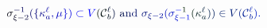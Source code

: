 \documentclass[12pt]{article}
\begin{document}
\makeatletter
\renewcommand*{\@textcolor}[3]{%
  \protect\leavevmode
  \begingroup
    \color#1{#2}#3%
  \endgroup
}
\makeatother
\begin{displaymath}
\mathcolor[RGB]{0,0,15}{\sigma} _ { \mathcolor[RGB]{0,0,30}{\xi} \mathcolor[RGB]{0,0,45}{-} \mathcolor[RGB]{0,0,60}{2} } ^ { \mathcolor[RGB]{0,0,75}{-} \mathcolor[RGB]{0,0,90}{1} } \mathcolor[RGB]{0,0,105}{(} \mathcolor[RGB]{0,0,120}{\{} \mathcolor[RGB]{0,0,135}{\kappa} _ { \mathcolor[RGB]{0,0,150}{a} } ^ { \mathcolor[RGB]{0,0,165}{\ell} } \mathcolor[RGB]{0,0,180}{,} \mathcolor[RGB]{0,0,195}{\mu} \mathcolor[RGB]{0,0,210}{\}} \mathcolor[RGB]{0,0,225}{)} \mathcolor[RGB]{0,0,240}{\subset} \mathcolor[RGB]{0,0,255}{V} \mathcolor[RGB]{0,15,0}{(} \mathcal { \mathcolor[RGB]{0,15,15}{C} } _ { \mathcolor[RGB]{0,15,30}{b} } ^ { \mathcolor[RGB]{0,15,45}{\ell} } \mathcolor[RGB]{0,15,60}{)} \mathrm { ~ \mathcolor[RGB]{0,15,75}{a} \mathcolor[RGB]{0,15,90}{n} \mathcolor[RGB]{0,15,105}{d} ~ } \mathcolor[RGB]{0,15,120}{\sigma} _ { \mathcolor[RGB]{0,15,135}{\xi} \mathcolor[RGB]{0,15,150}{-} \mathcolor[RGB]{0,15,165}{2} } \mathcolor[RGB]{0,15,180}{(} \mathcolor[RGB]{0,15,195}{\sigma} _ { \mathcolor[RGB]{0,15,210}{\xi} \mathcolor[RGB]{0,15,225}{-} \mathcolor[RGB]{0,15,240}{1} } ^ { \mathcolor[RGB]{0,15,255}{-} \mathcolor[RGB]{0,30,0}{1} } \mathcolor[RGB]{0,30,15}{(} \mathcolor[RGB]{0,30,30}{\kappa} _ { \mathcolor[RGB]{0,30,45}{a} } ^ { \mathcolor[RGB]{0,30,60}{\ell} } \mathcolor[RGB]{0,30,75}{)} \mathcolor[RGB]{0,30,90}{)} \mathcolor[RGB]{0,30,105}{\in} \mathcolor[RGB]{0,30,120}{V} \mathcolor[RGB]{0,30,135}{(} \mathcal { \mathcolor[RGB]{0,30,150}{C} } _ { \mathcolor[RGB]{0,30,165}{b} } ^ { \mathcolor[RGB]{0,30,180}{\ell} } \mathcolor[RGB]{0,30,195}{)} \mathcolor[RGB]{0,30,210}{.}
\end{displaymath}
\end{document}
